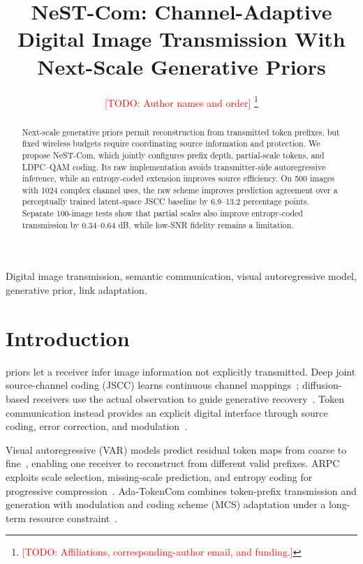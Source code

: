 \documentclass[journal]{IEEEtran}
\newcommand{\todo}[1]{\textcolor{red}{[TODO: #1]}}
\begin{document}
\title{NeST-Com: Channel-Adaptive Digital Image Transmission With Next-Scale Generative Priors}
\author{\todo{Author names and order}%
\thanks{\todo{Affiliations, corresponding-author email, and funding.}}}
\maketitle

\begin{abstract}
Next-scale generative priors permit reconstruction from transmitted token prefixes, but fixed wireless budgets require coordinating source information and protection. We propose NeST-Com, which jointly configures prefix depth, partial-scale tokens, and LDPC--QAM coding. Its raw implementation avoids transmitter-side autoregressive inference, while an entropy-coded extension improves source efficiency. On 500 images with 1024 complex channel uses, the raw scheme improves prediction agreement over a perceptually trained latent-space JSCC baseline by 6.9--13.2 percentage points. Separate 100-image tests show that partial scales also improve entropy-coded transmission by 0.34--0.64 dB, while low-SNR fidelity remains a limitation.
\end{abstract}
\begin{IEEEkeywords}
Digital image transmission, semantic communication, visual autoregressive model, generative prior, link adaptation.
\end{IEEEkeywords}

\section{Introduction}
 priors let a receiver infer image information not explicitly transmitted. Deep joint source-channel coding (JSCC) learns continuous channel mappings~\cite{bourtsoulatze2019deep,yang2023swinjscc}; diffusion-based receivers use the actual observation to guide generative recovery~\cite{wang2025diffcom}. Token communication instead provides an explicit digital interface through source coding, error correction, and modulation~\cite{qiao2025tokcom}.

Visual autoregressive (VAR) models predict residual token maps from coarse to fine~\cite{tian2024var}, enabling one receiver to reconstruct from different valid prefixes. ARPC exploits scale selection, missing-scale prediction, and entropy coding for progressive compression~\cite{arpc2026}. Ada-TokenCom combines token-prefix transmission and generation with modulation and coding scheme (MCS) adaptation under a long-term resource constraint~\cite{adatokencom2026}.
\end{document}
